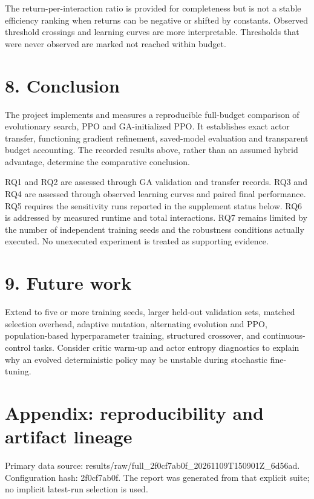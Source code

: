 \documentclass[11pt,a4paper]{article}
\begin{document}
The return-per-interaction ratio is provided for completeness but is not a stable efficiency ranking when returns can be negative or shifted by constants. Observed threshold crossings and learning curves are more interpretable. Thresholds that were never observed are marked not reached within budget.

\section*{8. Conclusion}
The project implements and measures a reproducible full-budget comparison of evolutionary search, PPO and GA-initialized PPO. It establishes exact actor transfer, functioning gradient refinement, saved-model evaluation and transparent budget accounting. The recorded results above, rather than an assumed hybrid advantage, determine the comparative conclusion.

RQ1 and RQ2 are assessed through GA validation and transfer records. RQ3 and RQ4 are assessed through observed learning curves and paired final performance. RQ5 requires the sensitivity runs reported in the supplement status below. RQ6 is addressed by measured runtime and total interactions. RQ7 remains limited by the number of independent training seeds and the robustness conditions actually executed. No unexecuted experiment is treated as supporting evidence.

\section*{9. Future work}
Extend to five or more training seeds, larger held-out validation sets, matched selection overhead, adaptive mutation, alternating evolution and PPO, population-based hyperparameter training, structured crossover, and continuous-control tasks. Consider critic warm-up and actor entropy diagnostics to explain why an evolved deterministic policy may be unstable during stochastic fine-tuning.

\section*{Appendix: reproducibility and artifact lineage}
Primary data source: results/raw/full\_2f0cf7ab0f\_20261109T150901Z\_6d56ad. Configuration hash: 2f0cf7ab0f. The report was generated from that explicit suite; no implicit latest-run selection is used.
\end{document}
